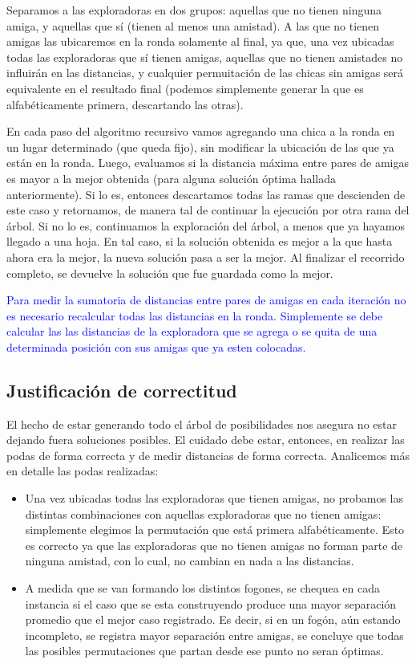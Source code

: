 Separamos a las exploradoras en dos grupos: aquellas que no tienen ninguna amiga, y aquellas que sí (tienen al menos una amistad). A las que no tienen amigas las ubicaremos en la ronda solamente al final, ya que, una vez ubicadas todas las exploradoras que sí tienen amigas, aquellas que no tienen amistades no influirán en las distancias, y cualquier permuitación de las chicas sin amigas será equivalente en el resultado final (podemos simplemente generar la que es alfabéticamente primera, descartando las otras).

En cada paso del algoritmo recursivo vamos agregando una chica a la ronda en un lugar determinado (que queda fijo), sin modificar la ubicación de las que ya están en la ronda. Luego, evaluamos si la distancia máxima entre pares de amigas es mayor a la mejor obtenida (para alguna solución óptima hallada anteriormente). Si lo es, entonces descartamos todas las ramas que descienden de este caso y retornamos, de manera tal de continuar la ejecución por otra rama del árbol. Si no lo es, continuamos la exploración del árbol, a menos que ya hayamos llegado a una hoja. En tal caso, si la solución obtenida es mejor a la que hasta ahora era la mejor, la nueva solución pasa a ser la mejor. Al finalizar el recorrido completo, se devuelve la solución que fue guardada como la mejor.

{\large \textcolor{blue}{Para medir la sumatoria de distancias entre pares de amigas en cada iteración no es necesario recalcular todas las distancias en la ronda. Simplemente se debe calcular las las distancias de la exploradora que se agrega o se quita de una determinada posición con sus amigas que ya esten colocadas.}}



\subsection{Justificación de correctitud}

El hecho de estar generando todo el árbol de posibilidades nos asegura no estar dejando fuera soluciones posibles. El cuidado debe estar, entonces, en realizar las podas de forma correcta y de medir distancias de forma correcta. Analicemos más en detalle las podas realizadas:

\begin{itemize}
 \item Una vez ubicadas todas las exploradoras que tienen amigas, no probamos las distintas combinaciones con aquellas exploradoras que no tienen amigas: simplemente elegimos la permutación que está primera alfabéticamente. Esto es correcto ya que las exploradoras que no tienen amigas no forman parte de ninguna amistad, con lo cual, no cambian en nada a las distancias.
 \item A medida que se van formando los distintos fogones, se chequea en cada instancia si el caso que se esta construyendo produce una mayor separación promedio que el mejor caso registrado. Es decir, si en un fogón, aún estando incompleto, se registra mayor separación entre amigas, se concluye que todas las posibles permutaciones que partan desde ese punto no seran óptimas.
 \end{itemize}
 
